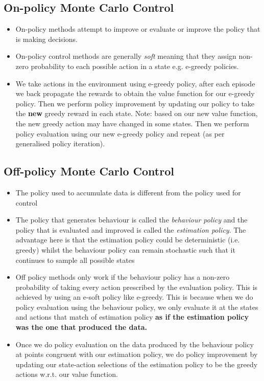 \subsection{On-policy Monte Carlo Control}
\begin{itemize}
\item On-policy methods attempt to improve or evaluate or improve the policy that is making decisions.
\item On-policy control methods are generally \textit{soft} meaning that they assign non-zero probability to each possible action in a state e.g. e-greedy policies.
\item We take actions in the environment using e-greedy policy, after each episode we back propagate the rewards to obtain the value function for our e-greedy policy. Then we perform policy improvement by updating our policy to take the \textbf{new} greedy reward in each state. Note: based on our new value function, the new greedy action may have changed in some states. Then we perform policy evaluation using our new e-greedy policy and repeat  (as per generalised policy iteration).
\end{itemize}

\subsection{Off-policy Monte Carlo Control}
\begin{itemize}
\item The policy used to accumulate data is different from the policy used for control
\item The policy that generates behaviour is called the \textit{behaviour policy} and the policy that is evaluated and improved is called the \textit{estimation policy}. The advantage here is that the estimation policy could be deterministic (i.e. greedy) whilst the behaviour policy can remain stochastic such that it continues to sample all possible states
\item Off policy methods only work if the behaviour policy has a non-zero probability of taking every action prescribed by the evaluation policy. This is achieved by using an e-soft policy like e-greedy. This is because when we do policy evaluation using the behaviour policy, we only evaluate it at the states and actions that match of estimation policy \textbf{as if the estimation policy was the one that produced the data.}
\item Once we do policy evaluation on the data produced by the behaviour policy at points congruent with our estimation policy, we do policy improvement by updating our state-action selections of the estimation policy to be the greedy actions w.r.t. our value function.
\end{itemize}

